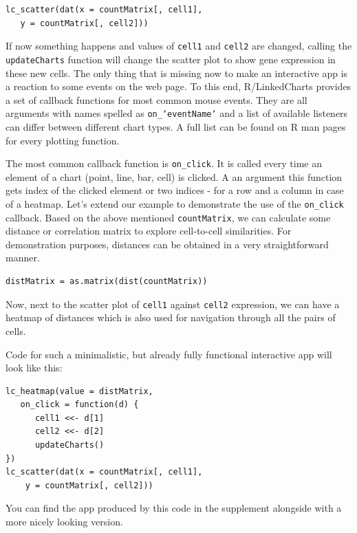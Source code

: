 \documentclass[twocolumn,10pt]{article}
\begin{document}
\begin{verbatim}
lc_scatter(dat(x = countMatrix[, cell1], 
   y = countMatrix[, cell2]))
\end{verbatim}

If now something happens and values of \texttt{cell1} and \texttt{cell2} are changed, calling the \texttt{updateCharts} function will change the scatter plot to show gene expression in these new cells. The only thing that is missing now to make an interactive app is a reaction to some events on the web page. To this end, R/LinkedCharts provides a set of callback functions for most common mouse events. They are all arguments with names spelled as \texttt{on_`eventName`} and a list of available listeners can differ between different chart types. A full list can be found on R man pages for every plotting function.

The most common callback function is \texttt{on_click}. It is called every time an element of a chart (point, line, bar, cell) is clicked. A an argument this function gets index of the clicked element or two indices - for a row and a column in case of a heatmap. Let's extend our example to demonstrate the use of the \texttt{on_click} callback. Based on the above mentioned \texttt{countMatrix}, we can calculate some distance or correlation matrix to explore cell-to-cell similarities. For demonstration purposes, distances can be obtained in a very straightforward manner.

\begin{verbatim}
distMatrix = as.matrix(dist(countMatrix))
\end{verbatim}

Now, next to the scatter plot of \texttt{cell1} against \texttt{cell2} expression, we can have a heatmap of distances which is also used for navigation through all the pairs of cells. 

Code for such a minimalistic, but already fully functional interactive app will look like this:

\begin{verbatim}
lc_heatmap(value = distMatrix, 
   on_click = function(d) {
      cell1 <<- d[1]
      cell2 <<- d[2]
      updateCharts()
})
lc_scatter(dat(x = countMatrix[, cell1],
	y = countMatrix[, cell2]))
\end{verbatim}

You can find the app produced by this code in the supplement alongside with a more nicely looking version.
\end{document}
